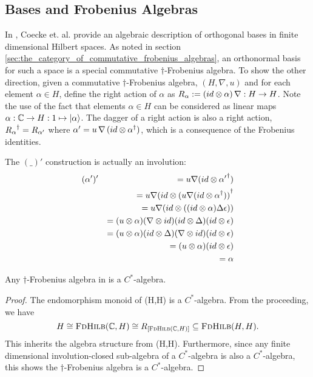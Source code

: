 \subsection{Bases and Frobenius Algebras} %
\label{sub:bases_and_frobenius_algebras}
In \cite{coeckeetal08:ortho}, Coecke et. al. provide an algebraic description of orthogonal bases in
finite dimensional Hilbert spaces. As noted in section
\ref{sec:the_category_of_commutative_frobenius_algebras}, an orthonormal basis for such a space is
a special commutative $\dagger$-Frobenius algebra. To show the other direction, given a commutative
$\dagger$-Frobenius algebra, $(H,\nabla,u)$ and for each element $\alpha\in H$, define the right
action of $\alpha$ as $R_{\alpha}:=(id\otimes\alpha)\, \nabla:H\to H$. Note the use of the fact that
elements $\alpha\in H$ can be considered as linear maps $\alpha:\mathbb{C} \to H:1\mapsto \left\vert{\alpha}\right\rangle$.
The dagger of a right action is also a right action, ${R_{\alpha}}^{\dagger} = R_{\alpha'}$ where
$\alpha'= u\, \nabla\, (id\otimes {\alpha}^{\dagger})$, which is a consequence of the Frobenius identities.

The $(\_)'$ construction is actually an involution:
\begin{eqnarray*}
  &(\alpha')' &= u \nabla (id \otimes {\alpha'}^{\dagger}) \\
  && = u \nabla (id \otimes {(u \nabla (id \otimes \ensuremath{{\alpha}^{\dagger}}))}^{\dagger}\\
  && = u \nabla (id \otimes ( (id \otimes \alpha) \Delta \epsilon))\\
  && = (u \otimes \alpha) (\nabla \otimes id) (id \otimes \Delta) (id \otimes  \epsilon)\\
  && = (u \otimes \alpha) (id \otimes \Delta) (\nabla \otimes id) (id \otimes  \epsilon)\\
  && = (u \otimes \alpha)  (id \otimes  \epsilon)\\
  && = \alpha
\end{eqnarray*}

\begin{lemma}\label{lemma:cstaralgebra}
  Any $\dagger$-Frobenius algebra in \fdh is a $C^{*}$-algebra.
\end{lemma}
\begin{proof}
  The endomorphism monoid of \fdh(H,H) is a $C^{*}$-algebra. From the proceeding, we have
  \[
    H \cong \textsc{FdHilb}(\mathbb{C},H) \cong R_{[\textsc{FdHilb}(\mathbb{C},H)]}\subseteq\textsc{FdHilb}(H,H).
  \]
  This inherits the algebra structure from \fdh(H,H). Furthermore, since any finite dimensional
  involution-closed sub-algebra of a $C^{*}$-algebra is also a $C^{*}$-algebra, this shows the
  $\dagger$-Frobenius algebra is a $C^{*}$-algebra.
\end{proof}

